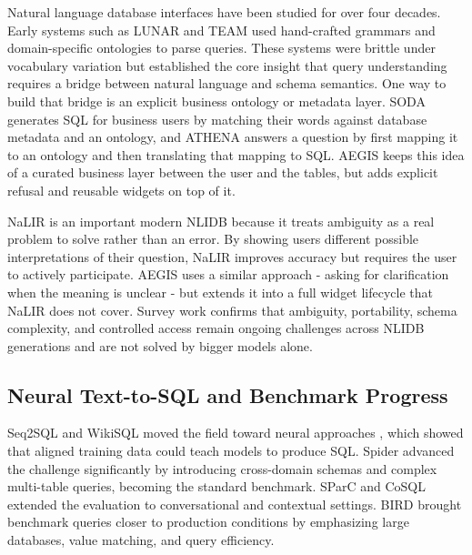 \documentclass[pdflatex,sn-mathphys-num]{sn-jnl}
\begin{document}
Natural language database interfaces have been studied for over four decades. Early systems such as LUNAR \citep{woods1973lunar} and TEAM \citep{grosz1983team} used hand-crafted grammars and domain-specific ontologies to parse queries. These systems were brittle under vocabulary variation but established the core insight that query understanding requires a bridge between natural language and schema semantics. One way to build that bridge is an explicit business ontology or metadata layer. SODA \citep{blunschi2012soda} generates SQL for business users by matching their words against database metadata and an ontology, and ATHENA \citep{saha2016athena} answers a question by first mapping it to an ontology and then translating that mapping to SQL. AEGIS keeps this idea of a curated business layer between the user and the tables, but adds explicit refusal and reusable widgets on top of it.


NaLIR \citep{li2014nalir} is an important modern NLIDB because it treats ambiguity as a real problem to solve rather than an error. By showing users different possible interpretations of their question, NaLIR improves accuracy but requires the user to actively participate. AEGIS uses a similar approach - asking for clarification when the meaning is unclear - but extends it into a full widget lifecycle that NaLIR does not cover. Survey work \citep{affolter2019survey,liu2026review} confirms that ambiguity, portability, schema complexity, and controlled access remain ongoing challenges across NLIDB generations and are not solved by bigger models alone.


\subsection{Neural Text-to-SQL and Benchmark Progress}

Seq2SQL and WikiSQL moved the field toward neural approaches \citep{zhong2018seq2sql}, which showed that aligned training data could teach models to produce SQL. Spider \citep{yu2018spider} advanced the challenge significantly by introducing cross-domain schemas and complex multi-table queries, becoming the standard benchmark. SParC and CoSQL \citep{yu2019sparc,yu2019cosql} extended the evaluation to conversational and contextual settings. BIRD \citep{li2023bird} brought benchmark queries closer to production conditions by emphasizing large databases, value matching, and query efficiency.
\end{document}
